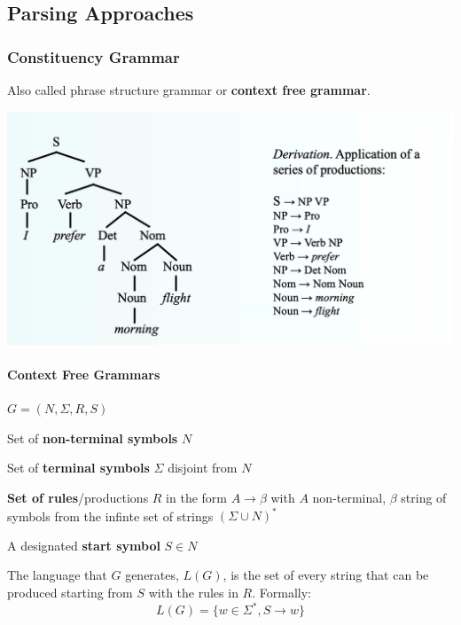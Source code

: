 \documentclass[10pt]{report}
\begin{document}
\subsection{Parsing Approaches}
\subsubsection{Constituency Grammar}
Also called phrase structure grammar or \textbf{context free grammar}.
\begin{center}
	\includegraphics[scale=0.5]{36.png}
\end{center}
\paragraph{Context Free Grammars} $G = (N,\Sigma, R, S)$
\begin{list}{}{}
	\item Set of \textbf{non-terminal symbols} $N$
	\item Set of \textbf{terminal symbols} $\Sigma$ disjoint from $N$
	\item \textbf{Set of rules}/productions $R$ in the form $A\rightarrow\beta$ with $A$ non-terminal, $\beta$ string of symbols from the infinte set of strings $(\Sigma\cup N)^*$
	\item A designated \textbf{start symbol} $S \in N$
\end{list}
The language that $G$ generates, $L(G)$, is the set of every string that can be produced starting from $S$ with the rules in $R$. Formally:
$$L(G) = \{w\in \Sigma^*, S\rightarrow w\}$$
\end{document}

